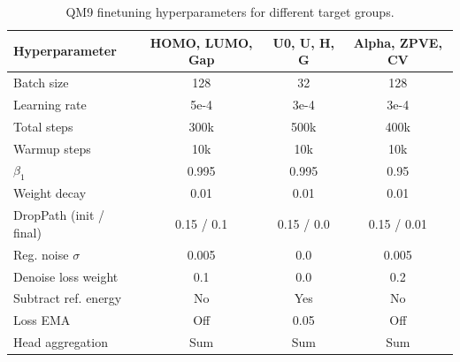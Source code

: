 \begin{table}[t]
\centering
\caption{QM9 finetuning hyperparameters for different target groups.}
\label{tab:qm9_finetune_hparams}
\begin{tabular}{lccc}
\toprule
\textbf{Hyperparameter} &
\textbf{HOMO, LUMO, Gap} &
\textbf{U0, U, H, G} &
\textbf{Alpha, ZPVE, CV} \\
\midrule
Batch size                 & 128   & 32    & 128   \\
Learning rate              & 5e{-4} & 3e{-4} & 3e{-4} \\
Total steps                & 300k  & 500k  & 400k  \\
Warmup steps               & 10k   & 10k   & 10k   \\
$\beta_1$                  & 0.995 & 0.995 & 0.95  \\
Weight decay               & 0.01  & 0.01  & 0.01  \\
DropPath (init / final)    & 0.15 / 0.1 & 0.15 / 0.0 & 0.15 / 0.01 \\
Reg. noise $\sigma$        & 0.005 & 0.0 & 0.005 \\
Denoise loss weight        & 0.1   & 0.0   & 0.2   \\
Subtract ref. energy       & No    & Yes   & No    \\
Loss EMA                   & Off   & 0.05  & Off   \\
Head aggregation           & Sum   & Sum   & Sum   \\
\bottomrule
\end{tabular}
\end{table}



